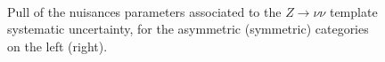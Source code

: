 \begin{figure}[tbhp]
    \caption{ Pull of the nuisances parameters associated to the $Z\rightarrow\nu\nu$ template systematic uncertainty, 
      for the asymmetric (symmetric) categories on the left (right).
      \label{fig:nuisPull_TemplateZinv}}
  \begin{center}
     \\
  \end{center}
\end{figure}


